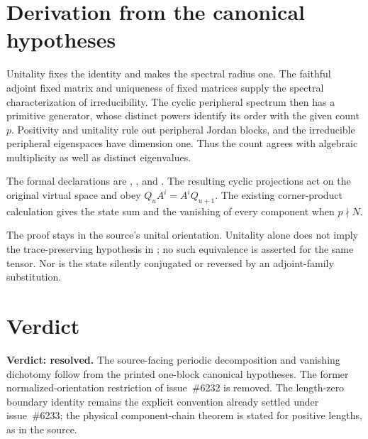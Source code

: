 \documentclass{article}
\begin{document}
\section{Derivation from the canonical hypotheses}

Unitality fixes the identity and makes the spectral radius one. The faithful
adjoint fixed matrix and uniqueness of fixed matrices supply the spectral
characterization of irreducibility. The cyclic peripheral spectrum then has a
primitive generator, whose distinct powers identify its order with the given
count $p$. Positivity and unitality rule out peripheral Jordan blocks, and the
irreducible peripheral eigenspaces have dimension one. Thus the count agrees
with algebraic multiplicity as well as distinct eigenvalues.

The formal declarations are
,
, and
.
The resulting cyclic projections act on the original virtual space and obey
$Q_uA^i=A^iQ_{u+1}$. The existing corner-product calculation gives the state
sum and the vanishing of every component when $p\nmid N$.

The proof stays in the source's unital orientation. Unitality alone does not
imply the trace-preserving hypothesis in ; no
such equivalence is asserted for the same tensor. Nor is the state silently
conjugated or reversed by an adjoint-family substitution.

\section{Verdict}

\textbf{Verdict: resolved.} The source-facing periodic decomposition and
vanishing dichotomy follow from the printed one-block canonical hypotheses.
The former normalized-orientation restriction of issue~\#6232 is removed.
The length-zero boundary identity remains the explicit convention already
settled under issue~\#6233; the physical component-chain theorem is stated
for positive lengths, as in the source.



\end{document}
